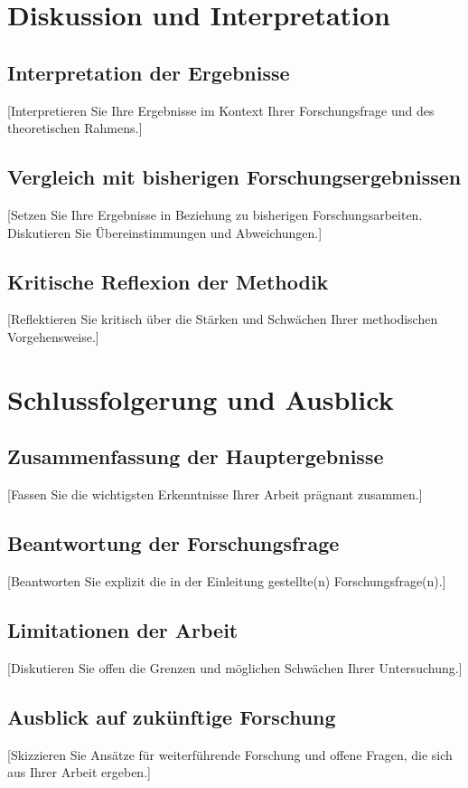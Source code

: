 \documentclass[12pt,a4paper,oneside]{article}
\begin{document}
\clearpage
\section{Diskussion und Interpretation}
\subsection{Interpretation der Ergebnisse}
[Interpretieren Sie Ihre Ergebnisse im Kontext Ihrer Forschungsfrage und des theoretischen Rahmens.]

\subsection{Vergleich mit bisherigen Forschungsergebnissen}
[Setzen Sie Ihre Ergebnisse in Beziehung zu bisherigen Forschungsarbeiten. Diskutieren Sie Übereinstimmungen und Abweichungen.]

\subsection{Kritische Reflexion der Methodik}
[Reflektieren Sie kritisch über die Stärken und Schwächen Ihrer methodischen Vorgehensweise.]

\clearpage
\section{Schlussfolgerung und Ausblick}
\subsection{Zusammenfassung der Hauptergebnisse}
[Fassen Sie die wichtigsten Erkenntnisse Ihrer Arbeit prägnant zusammen.]

\subsection{Beantwortung der Forschungsfrage}
[Beantworten Sie explizit die in der Einleitung gestellte(n) Forschungsfrage(n).]

\subsection{Limitationen der Arbeit}
[Diskutieren Sie offen die Grenzen und möglichen Schwächen Ihrer Untersuchung.]

\subsection{Ausblick auf zukünftige Forschung}
[Skizzieren Sie Ansätze für weiterführende Forschung und offene Fragen, die sich aus Ihrer Arbeit ergeben.]
\end{document}
